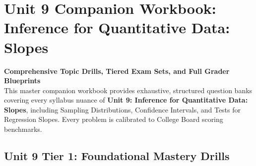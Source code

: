 \chapter{Unit 9 Companion Workbook: Inference for Quantitative Data: Slopes}
\label{chap:companion_unit_9}
{\large\bfseries\color{MidnightBlue} Comprehensive Topic Drills, Tiered Exam Sets, and Full Grader Blueprints}\\[8pt]
This master companion workbook provides exhaustive, structured question banks covering every syllabus nuance of \textbf{Unit 9: Inference for Quantitative Data: Slopes}, including Sampling Distributions, Confidence Intervals, and Tests for Regression Slopes. Every problem is calibrated to College Board scoring benchmarks.\\[12pt]
\section{Unit 9 Tier 1: Foundational Mastery Drills}
